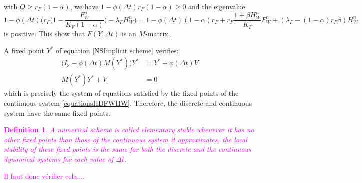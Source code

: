 \documentclass{article}
\newcommand{\lfw}{\lambda_{F}}
\newcommand{\lfw}{\lambda_{F}}
\newcommand{\cI}{\mathcal{I}}
\newcommand{\marc}[1]{\textcolor{teal}{#1}}
\newcommand{\YD}[1]{\textcolor{magenta}{#1}}
\newtheorem{definition}{Definition}
\begin{document}
with $Q \geq r_F(1 - \alpha)$, we have $1 - \phi(\Delta t)r_F(1-\alpha) \geq 0$ and the eigenvalue $$1 - \phi(\Delta t) \Big(r_F\Big(1 - \dfrac{F_W^n}{K_F(1 - \alpha)} \Big) - \lfw H_W^n \Big) = 1 - \phi(\Delta t)(1-\alpha)r_F + r_F \dfrac{1 + \beta H_W^n}{K_F}F^n_W + (\lfw - (1-\alpha) r_F  \beta) H^n_W $$ is positive. This show that $F(Y, \Delta t)$ is an $M$-matrix.

\medskip
A fixed point $Y^*$ of equation \eqref{NSImplicit scheme} verifies:
\begin{align*}
\Big(I_3 - \phi(\Delta t) M(Y^*) \Big) Y^* &= Y^* + \phi(\Delta t)V \\
 M(Y^*) Y^* + V&= 0
\end{align*}
which is precisely the system of equations satisfied by the fixed points of the continuous system \eqref{equationsHDFWHW}. Therefore, the discrete and continuous system have the same fixed points.

\YD{
\begin{definition}
A numerical scheme is called elementary stable whenever it has no other fixed points than those of the continuous system it approximates, the local stability of these fixed points is the same for both the discrete and the continuous dynamical systems for each value of $\Delta t$.
\end{definition}
Il faut donc vérifier cela....
}


\end{document}
